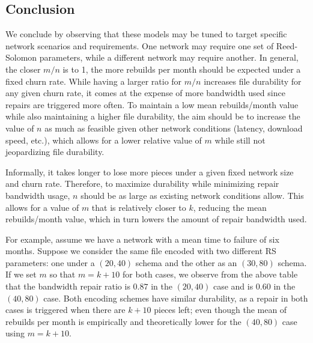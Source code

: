 \subsection{Conclusion}

We conclude by observing that these models may be tuned to target specific network scenarios and requirements. One network may require one set of Reed-Solomon parameters, while a different network may require another. In general, the closer $m/n$ is to 1, the more rebuilds per month should be expected under a fixed churn rate. While having a larger ratio for $m/n$ increases file durability for any given churn rate, it comes at the expense of more bandwidth used since repairs are triggered more often. To maintain a low mean rebuilds/month value while also maintaining a higher file durability, the aim should be to increase the value of $n$ as much as feasible given other network conditions (latency, download speed, etc.), which allows for a lower relative value of $m$ while still not jeopardizing file durability.

Informally, it takes longer to lose more pieces under a given fixed network size and churn rate. Therefore, to maximize durability while minimizing repair bandwidth usage, $n$ should be as large as existing network conditions allow. This allows for a value of $m$ that is relatively closer to $k$, reducing the mean rebuilds/month value, which in turn lowers the amount of repair bandwidth used.

For example, assume we have a network with a mean time to failure of six months.
Suppose we consider the same file encoded with two different RS parameters:
one under a $(20,40)$ schema and the other as an $(30,80)$ schema. If we set $m$ so that $m=k+10$ for both cases, we observe from the above table
that the bandwidth repair ratio is $0.87$ in the $(20,40)$ case and is $0.60$ in the $(40,80)$ case. Both encoding schemes have similar durability, as a repair in both cases is triggered when there are $k+10$ pieces left; even though the mean of rebuilds per month
is empirically and theoretically lower for the $(40,80)$ case using $m=k+10$.
